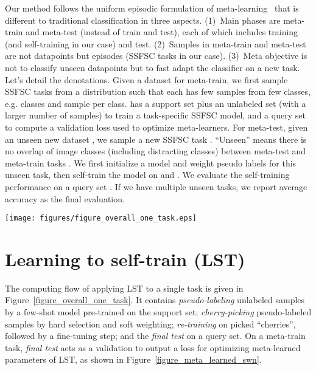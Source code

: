 \documentclass{article}
\begin{document}
Our method follows the uniform episodic formulation of meta-learning~\cite{VinyalsBLKW16} that is different to traditional classification in three aspects. (1)~Main phases are meta-train and meta-test (instead of train and test), each of which includes training (and
self-training in our case) and test. (2)~Samples in meta-train and meta-test are not datapoints but episodes (SSFSC tasks in our case). (3)~Meta objective is not to classify unseen datapoints but to fast adapt the classifier on a new task. 
Let's detail the denotations. 
Given a dataset  for meta-train, we first sample SSFSC tasks  from a distribution  such that each  has few samples from few classes, e.g.  classes and  sample per class. 
 has a support set  plus an unlabeled set  (with a larger number of samples) to train a task-specific SSFSC model, and a query set  to compute a validation loss used to optimize meta-learners.
For meta-test, given an unseen new dataset , we sample a new SSFSC task . ``Unseen'' means there is no overlap of image classes (including distracting classes) between meta-test and meta-train tasks . We first initialize a model and weight pseudo labels for this unseen task, then self-train the model on  and .
We evaluate the self-training performance on a query set . 
If we have multiple unseen tasks, we report average accuracy as the final evaluation.








\begin{figure*}[t]
  \centering
  \texttt{[image: figures/figure\_overall\_one\_task.eps]}
     \caption{The pipeline of the proposed \textbf{LST} method on a single (-class, -shot) task. 
     The prototype of a class is the mean feature in the class, and SWN is the soft weighting network whose optimization procedure is given in Figure~\ref{figure_meta_learned_swn} and Section~\ref{sec_retraining}.}
  \label{figure_overall_one_task}
  \vspace{-4mm}
\end{figure*}
 

\section{Learning to self-train (LST)}

The computing flow of applying LST to a single task is given in Figure~\ref{figure_overall_one_task}.
It contains
\emph{pseudo-labeling} unlabeled samples by a few-shot model pre-trained on the support set; 
\emph{cherry-picking} pseudo-labeled samples by hard selection and soft weighting; \emph{re-training} on picked ``cherries'', followed by a fine-tuning step;
and the \emph{final test} on a query set.
On a meta-train task, \emph{final test} acts as a validation to output a loss for optimizing meta-learned parameters of LST, as shown in Figure~\ref{figure_meta_learned_swn}.
\end{document}
